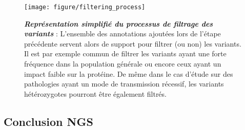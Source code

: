 \documentclass[12pt,a4paper,twoside]{ugathesis}
\theoremstyle{definition}
\theoremstyle{definition}
\theoremstyle{definition}
\theoremstyle{remark}
\begin{document}
\begin{figure}

{\centering \texttt{[image: figure/filtering\_process]} 

}

\caption[Représentation simplifié du processus de filtrage des variants]{\textbf{\emph{Représentation simplifié du processus de
filtrage des variants}} : L'ensemble des annotations ajoutées lors de
l'étape précédente servent alors de support pour filtrer (ou non) les
variants. Il est par exemple commun de filtrer les variants ayant une
forte fréquence dans la population générale ou encore ceux ayant un
impact faible sur la protéine. De même dans le cas d'étude sur des
pathologies ayant un mode de transmission récessif, les variants
hétérozygotes pourront être également filtrés.}\label{fig:pictfilter}
\end{figure}










\newpage

\subsection{Conclusion NGS}\label{conclusion-ngs}
\end{document}
